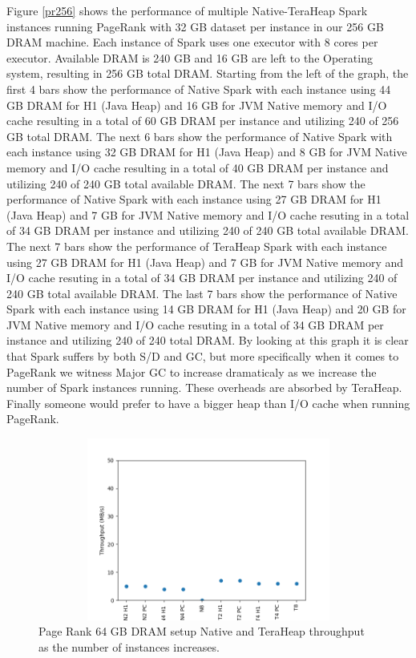 \documentclass[twocolumn,10pt]{asme2e}
\begin{document}
Figure \ref{pr256} shows the performance of multiple Native-TeraHeap Spark instances running PageRank with 32 GB dataset per instance in our 256 GB DRAM machine. Each instance of Spark uses one executor with 8 cores per executor. Available DRAM is 240 GB and 16 GB are left to the Operating system, resulting in 256 GB total DRAM. Starting from the left of the graph, the first 4 bars show the performance of Native Spark with each instance using 44 GB DRAM for H1 (Java Heap) and 16 GB for JVM Native memory and I/O cache resulting in a total of 60 GB DRAM per instance and utilizing 240 of 256 GB total DRAM. The next 6 bars show the performance of Native Spark with each instance using 32 GB DRAM for H1 (Java Heap) and 8 GB for JVM Native memory and I/O cache resulting in a total of 40 GB DRAM per instance and utilizing 240 of 240 GB total available DRAM. The next 7 bars show the performance of Native Spark with each instance using 27 GB DRAM for H1 (Java Heap) and 7 GB for JVM Native memory and I/O cache resuting in a total of 34 GB DRAM per instance and utilizing 240 of 240 GB total available DRAM. The next 7 bars show the performance of TeraHeap Spark with each instance using 27 GB DRAM for H1 (Java Heap) and 7 GB for JVM Native memory and I/O cache resuting in a total of 34 GB DRAM per instance and utilizing 240 of 240 GB total available DRAM. The last 7 bars show the performance of Native Spark with each instance using 14 GB DRAM for H1 (Java Heap) and 20 GB for JVM Native memory and I/O cache resuting in a total of 34 GB DRAM per instance and utilizing 240 of 240 total DRAM. By looking at this graph it is clear that Spark suffers by both S/D and GC, but more specifically when it comes to PageRank we witness Major GC to increase dramaticaly as we increase the number of Spark instances running. These overheads are absorbed by TeraHeap.
Finally someone would prefer to have a bigger heap than I/O cache when running PageRank.

\begin{figure}[h!]
        \includegraphics[width=13cm,height=6cm]{PR_64_THR.png}
	\caption{Page Rank 64 GB DRAM setup Native and TeraHeap throughput as the number of instances increases.}
	\label{fig:pr_64_thr}
\end{figure}
\end{document}

